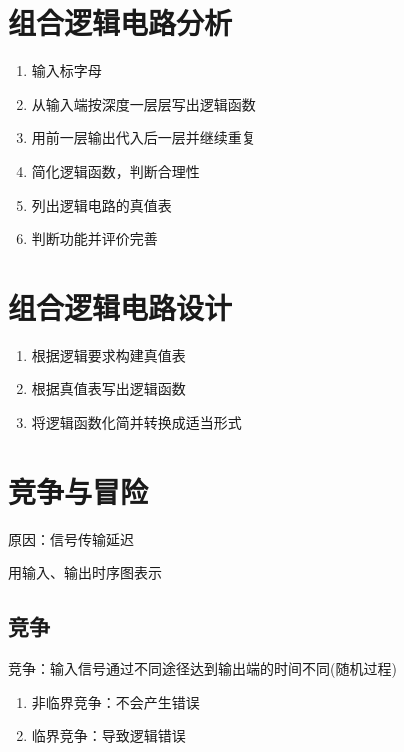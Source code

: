 \newpage

\section{组合逻辑电路分析}

\begin{enumerate}

    \item 输入标字母
    \item 从输入端按深度一层层写出逻辑函数
    \item 用前一层输出代入后一层并继续重复
    \item 简化逻辑函数，判断合理性
    \item 列出逻辑电路的真值表
    \item 判断功能并评价完善

\end{enumerate}

\section{组合逻辑电路设计}

\begin{enumerate}

    \item 根据逻辑要求构建真值表
    \item 根据真值表写出逻辑函数
    \item 将逻辑函数化简并转换成适当形式

\end{enumerate}

\newpage

\section{竞争与冒险}

原因：信号传输延迟

用输入、输出时序图表示

\subsection{竞争}

竞争：输入信号通过不同途径达到输出端的时间不同(随机过程)

\begin{enumerate}

    \item 非临界竞争：不会产生错误
    \item 临界竞争：导致逻辑错误

\end{enumerate}

